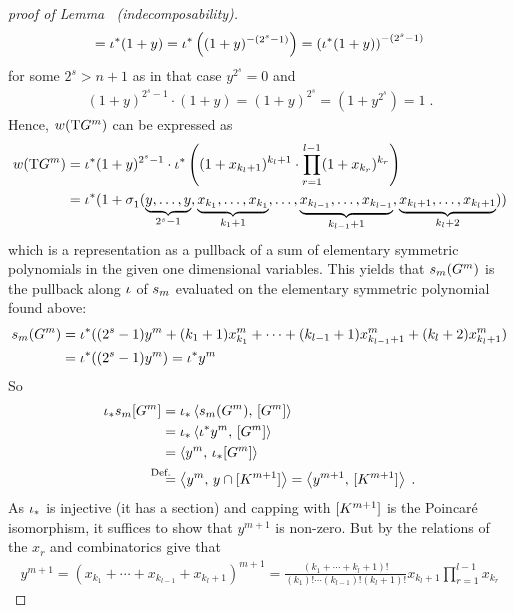 \begin{proof}[proof of
  Lemma~
  (indecomposability)]
\begin{gather*}
    = {{\iota}}^*(1+y)
    = {{\iota}}^*\left((1+y)^{-(2^s-1)}\right)
    = \left({{\iota}}^*(1+y)\right)^{-(2^s-1)}
  \end{gather*}
  for some $2^s>n+1$ as in that case $y^{2^s}=0$ and
  \begin{gather*}
    (1+y)^{2^s-1} \cdot (1+y)
    = (1+y)^{2^s}
    = (1+y^{2^s})
    = 1
    \;.
  \end{gather*}
  Hence, ${w}(\mathrm{T}G^{m})$ can be expressed as
  \begin{align*}
    {w}(\mathrm{T}G^{m})
    &= {{\iota}}^*(1+y)^{2^s-1}
      \cdot {{\iota}}^*\left(
      (1+x_{k_l+1})^{k_l+1}
      \cdot \prod_{r=1}^{l-1}(1+x_{k_r})^{k_r}
      \right) \\
    &= {{\iota}}^*(1 + \sigma_{1}^{}(
      \underbrace{y,\dotsc,y}_{2^s-1},
      \underbrace{x_{k_1},\dotsc,x_{k_1}}_{k_1+1},
      \dotsc,
      \underbrace{x_{k_{l-1}},\dotsc,x_{k_{l-1}}}_{k_{l-1}+1},
      \underbrace{x_{k_l+1},\dotsc,x_{k_l+1}}_{k_l+2}
      ))
  \end{align*}
  which is a representation as a pullback of a sum of elementary
  symmetric polynomials in the given one dimensional variables.
  This yields that $s_{m}(G^{m})$ is the pullback along ${\iota}$ of
  $s_{m}$ evaluated on the elementary symmetric polynomial found above:
  \begin{align*}
    s_{m}(G^{m})
    &= {{\iota}}^*(
      (2^s-1)y^m
      + (k_1+1)x_{k_1}^m
      + \dotsb
      + (k_{l-1}+1)x_{k_{l-1}+1}^m
      + (k_l+2)x_{k_l+1}^m
      ) \\
    &= {{\iota}}^*((2^s-1)y^m)
      = {{\iota}}^* y^m
  \end{align*}
  So
  \begin{align*}
    \pf\emb\snum{m}{\G m}
    &= \pf\emb\capped{\s{m}(\G m)}{\fundcl{\G m}} \\
    &= \pf\emb\capped{\pb\emb y^m}{\fundcl{\G m}} \\
    &= \capped{y^m}{\pf\emb\fundcl{\G m}} \\
    &\equalsby{Def.} \capped{y^m}{y\cap\fundcl{K^{m+1}}}
      = \capped{y^{m+1}}{\fundcl{K^{m+1}}}
      \;.
  \end{align*}
  As ${{\iota}}_*$ is injective (it has a section) and capping with
  $[K^{m+1}]$ is the Poincaré isomorphism, it suffices to
  show that $y^{m+1}$ is non-zero. But by the relations of the
  $x_r$ and combinatorics give that
  \begin{gather*}
    y^{m+1}
    = (x_{k_1}+\dotsb+x_{k_{l-1}}+ x_{k_l +1})^{m+1}
    = \frac{(k_1+\dotsb+k_l+1)!}{(k_1)!\dotsm(k_{l-1})!(k_l+1)!}
    x_{k_l+1}\prod_{r=1}^{l-1}x_{k_r}

\end{gather*}
\end{proof}
